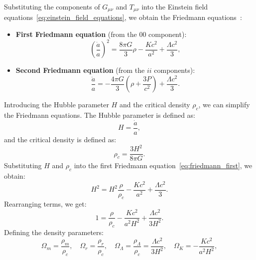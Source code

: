 Substituting the components of \( G_{\mu\nu} \) and \( T_{\mu\nu} \) into the Einstein field equations~\eqref{eq:einstein_field_equations}, we obtain the Friedmann equations~\citep{1922ZPhy...10..377F}:
\begin{itemize}
    \item \textbf{First Friedmann equation} (from the \( 00 \) component):
    \begin{equation}
        \left( \frac{\dot{a}}{a} \right)^2 = \frac{8\pi G}{3} \rho - \frac{K c^2}{a^2} + \frac{\Lambda c^2}{3},
        \label{eq:friedmann_first}
    \end{equation}
    \item \textbf{Second Friedmann equation} (from the \( ii \) components):
    \begin{equation}
        \frac{\ddot{a}}{a} = -\frac{4\pi G}{3} \left( \rho + \frac{3P}{c^2} \right) + \frac{\Lambda c^2}{3}.
        \label{eq:friedmann_second}
    \end{equation}
\end{itemize}
Introducing the Hubble parameter \( H \) and the critical density \( \rho_c \), we can simplify the Friedmann equations. The Hubble parameter is defined as:
\begin{equation}
    H = \frac{\dot{a}}{a},
    \label{eq:hubble_parameter}
\end{equation}
and the critical density is defined as:
\begin{equation}
    \rho_c = \frac{3 H^2}{8\pi G}.
    \label{eq:critical_density}
\end{equation}
Substituting \( H \) and \( \rho_c \) into the first Friedmann equation~\eqref{eq:friedmann_first}, we obtain:
\begin{equation}
    H^2 = H^2 \frac{\rho}{\rho_c} - \frac{K c^2}{a^2} + \frac{\Lambda c^2}{3}.
    \label{eq:friedmann_with_critical_density}
\end{equation}
Rearranging terms, we get:
\begin{equation}
    1 = \frac{\rho}{\rho_c} - \frac{K c^2}{a^2 H^2} + \frac{\Lambda c^2}{3 H^2}.
    \label{eq:friedmann_normalized}
\end{equation}
Defining the density parameters:
\begin{equation}
    \Omega_m = \frac{\rho_m}{\rho_c}, \quad \Omega_r = \frac{\rho_r}{\rho_c}, \quad \Omega_\Lambda = \frac{\rho_\Lambda}{\rho_c} = \frac{\Lambda c^2}{3 H^2}, \quad \Omega_K = -\frac{K c^2}{a^2 H^2},
    \label{eq:density_parameters}
\end{equation}
